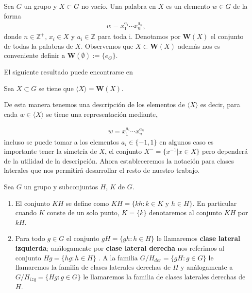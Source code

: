 \begin{df}
Sea $G$ un  grupo y $X \subset G$ no vacío. Una palabra en $X$ es un elemento $w \in G$ de la forma
\begin{align*}
w=x_1^{a_i} \cdots x_n^{a_n},
\end{align*}
donde $n \in \mathbb{Z}^+$, $x_i \in X$ y $a_i \in \mathbb{Z}$ para toda i. Denotamos por $\mathbf{W}(X)$ el conjunto de todas la palabras de  $X$. Observemos que $X \subset \mathbf{W}(X)$ además nos es conveniente definir a $\mathbf{W}(\emptyset) :=\{e_G\}$.
\end{df}
El siguiente resultado puede encontrarse en %

\begin{te}
Sea $X \subset G$ se tiene que $\langle X \rangle= \mathbf{W}(X)$.
\end{te}
De esta manera tenemos una descripción de los elementos de $\langle X \rangle$ es decir, para cada $w \in \langle X \rangle$ se tiene una representación mediante, 

\begin{align*}
w=x_1^{a_i} \cdots x_n^{a_n}
\end{align*}
incluso se puede tomar a los elementos $a_i \in \{-1,1\}$ en algunos caso es importante tener la simetría de $X$, el conjunto $X^-=\{x^{-1}| x \in X \}$ pero dependerá de la utilidad de la descripción. Ahora estableceremos la notación para clases laterales que nos permitirá desarrollar el resto de nuestro trabajo. 	
	
\begin{df}
Sea $G$ un grupo y subconjuntos $H$, $K$ de $G$.
\begin{enumerate}
		
		\item El conjunto $KH$ se define como  $KH=\{kh: k \in K \text{ y } h \in H \}$. En particular cuando $K$ conste de un solo punto, $K=\{k\}$ denotaremos al conjunto $KH$ por $kH$.	
		
		
		
		\item Para todo $g \in G$ el conjunto $gH=\{gh:h \in H \}$ le llamaremos \textbf{clase lateral izquierda}; análogamente por \textbf{clase lateral derecha} nos referimos al conjunto $Hg=\{hg:h \in H\}$ . A la familia  $G/H_{der}=\{gH:g \in G\}$
le llamaremos la familia de clases laterales derechas de $H$ y análogamente a $G/H_{izq}=\{Hg:g \in G\}$
le llamaremos la familia de clases laterales derechas de $H$. 
	\end{enumerate} 
\end{df}	

